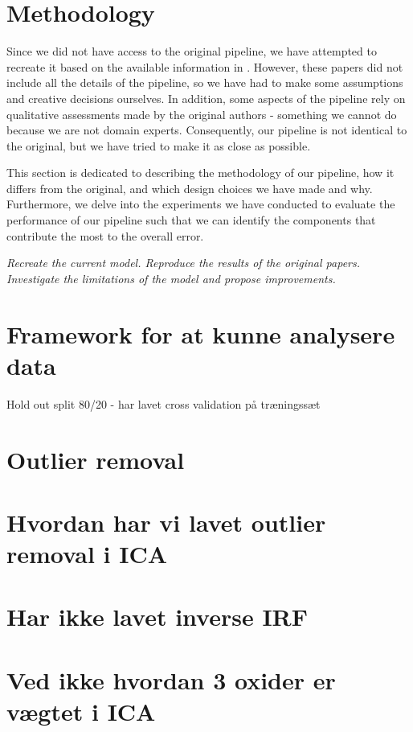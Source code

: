 \section{Methodology}\label{sec:methodology}
Since we did not have access to the original pipeline, we have attempted to recreate it based on the available information in \cite{}.
However, these papers did not include all the details of the pipeline, so we have had to make some assumptions and creative decisions ourselves.
In addition, some aspects of the pipeline rely on qualitative assessments made by the original authors - something we cannot do because we are not domain experts.
Consequently, our pipeline is not identical to the original, but we have tried to make it as close as possible.

This section is dedicated to describing the methodology of our pipeline, how it differs from the original, and which design choices we have made and why.
Furthermore, we delve into the experiments we have conducted to evaluate the performance of our pipeline such that we can identify the components that contribute the most to the overall error.

\textit{Recreate the current model. Reproduce the results of the original papers. Investigate the limitations of the model and propose improvements.}


\section{Framework for at kunne analysere data}
Hold out split 80/20 - har lavet cross validation på træningssæt



\section{Outlier removal}
\section{Hvordan har vi lavet outlier removal i ICA}
\section{Har ikke lavet inverse IRF}
\section{Ved ikke hvordan 3 oxider er vægtet i ICA}

